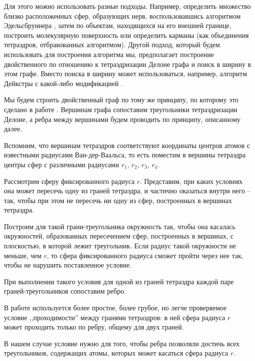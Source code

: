 Для этого можно использовать разные подходы. Например, определить множество близко расположенных сфер, образующих нерв, воспользовавшись алгоритмом Эдельсбруннера \cite{alpha_shapes1995, alpha_shapes1998}, затем по объектам, находящихся на его внешней границе, построить молекулярную поверхность или определить карманы (как объединения тетраэдров, отбракованных алгоритмом). Другой подход, который будем использовать для построения алгоритма мы, предполагает построение двойственного по отношению к тетраэдризации Делоне графа и поиск в ширину в этом графе. Вместо поиска в ширину может использоваться, например, алгоритм Дейкстры с какой-либо модификацией \cite{caver2007}.

Мы будем строить двойственный граф по тому же принципу, по которому это сделано в работе \cite{caver2007}. Вершинам графа сопоставим треугольники тетраэдризации Делоне, а ребра между вершинами будем проводить по принципу,  %
описанному далее. 

Вспомним, что вершинам тетраэдров соответствуют координаты центров атомов с известными радиусами Ван-дер-Ваальса, то есть поместим в вершины тетраэдра центры сфер с различными радиусами $r_1$, $r_2$, $r_3$, $r_4$.

Рассмотрим сферу фиксированного радиуса $r$. Представим, при каких условиях она может пересечь одну из граней тетраэдра, и частично оказаться внутри него -- так, чтобы при этом не пересечь ни одну из сфер, построенных в  вершинах тетраэдра. 

Построим для такой грани-треугольника окружность так, чтобы она касалась окружностей, образованных пересечением сфер, построенных в вершинах, с плоскостью, в которой лежит треугольник. Если радиус такой окружности не меньше, чем $r$, то сфера фиксированного радиуса сможет пройти через нее так, чтобы не нарушить поставленное условие.

При выполнении такого условия для одной из граней тетраэдра каждой паре граней-треугольников сопоставим ребро.

В работе \cite{caver2007} используется более простое, более грубое, но легче проверяемое условие ,,проходимости'' между гранями тетраэдров: в ней сфера радиуса $r$ может проходить только по ребру, общему для двух граней. 

В нашем случае условие нужно для того, чтобы  ребра позволяли достичь всех треугольников, содержащих атомы, которых может касаться сфера радиуса $r$. 


